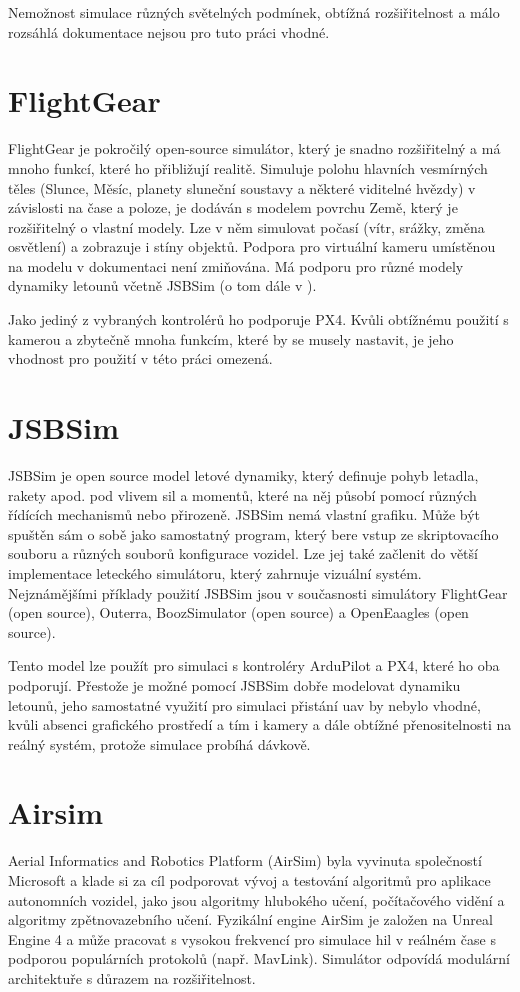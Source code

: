         Nemožnost simulace různých světelných podmínek, obtížná rozšiřitelnost a málo rozsáhlá dokumentace nejsou pro tuto práci vhodné.

    \section{FlightGear} \label{sec:flightgear}
        FlightGear je pokročilý open-source simulátor, který je snadno rozšiřitelný a má mnoho funkcí, které ho přibližují realitě. Simuluje polohu hlavních vesmírných těles (Slunce, Měsíc, planety sluneční soustavy a některé viditelné hvězdy) v závislosti na čase a poloze, je dodáván s modelem povrchu Země, který je rozšiřitelný o vlastní modely. Lze v něm simulovat počasí (vítr, srážky, změna osvětlení) a zobrazuje i stíny objektů. Podpora pro virtuální kameru umístěnou na modelu v dokumentaci není zmiňována. Má podporu pro různé modely dynamiky letounů včetně JSBSim (o tom dále v ). \cite{flightgear}

        Jako jediný z vybraných kontrolérů ho podporuje PX4. Kvůli obtížnému použití s kamerou a zbytečně mnoha funkcím, které by se musely nastavit, je jeho vhodnost pro použití v této práci omezená.

    \section{JSBSim} \label{sec:jsbsim}
        JSBSim je open source model letové dynamiky, který definuje pohyb letadla, rakety apod. pod vlivem sil a momentů, které na něj působí pomocí různých řídících mechanismů nebo přirozeně. JSBSim nemá vlastní grafiku. Může být spuštěn sám o sobě jako samostatný program, který bere vstup ze skriptovacího souboru a různých souborů konfigurace vozidel. Lze jej také začlenit do větší implementace leteckého simulátoru, který zahrnuje vizuální systém. Nejznámějšími příklady použití JSBSim jsou v současnosti simulátory FlightGear (open source), Outerra, BoozSimulator (open source) a OpenEaagles (open source). \cite{jsbsim}

        Tento model lze použít pro simulaci s kontroléry ArduPilot a PX4, které ho oba podporují. Přestože je možné pomocí JSBSim dobře modelovat dynamiku letounů, jeho samostatné využití pro simulaci přistání \acrshort{uav} by nebylo vhodné, kvůli absenci grafického prostředí a tím i kamery a dále obtížné přenositelnosti na reálný systém, protože simulace probíhá dávkově.

    \section{Airsim} \label{sec:airsim}
        Aerial Informatics and Robotics Platform (AirSim) byla vyvinuta společností Microsoft a klade si za cíl podporovat vývoj a testování algoritmů pro aplikace autonomních vozidel, jako jsou algoritmy hlubokého učení, počítačového vidění a algoritmy zpětnovazebního učení. Fyzikální engine AirSim je založen na Unreal Engine 4 a může pracovat s vysokou frekvencí pro simulace \acrshort{hil} v reálném čase s podporou populárních protokolů (např. MavLink). Simulátor odpovídá modulární architektuře s důrazem na rozšiřitelnost. \cite{Ebeid2018}


